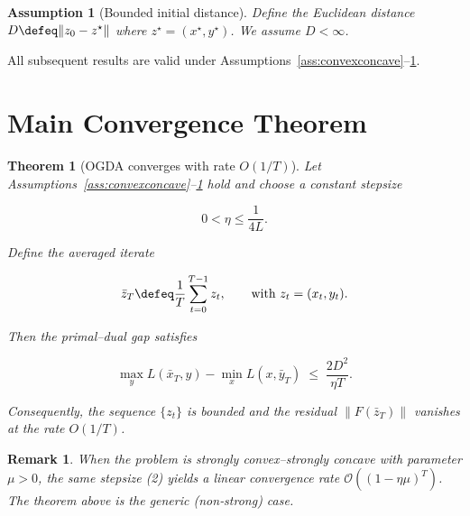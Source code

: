 \documentclass{article}
\newtheorem{theorem}{Theorem}
\newtheorem{assumption}{Assumption}
\newtheorem{remark}{Remark}
\begin{document}
\begin{assumption}[Bounded initial distance]\label{ass:bounded}
Define the Euclidean distance 
\(D\defeq\|z_{0}-z^{\star}\|\) where \(z^{\star}=(x^{\star},y^{\star})\). We assume \(D<\infty\).
\end{assumption}

All subsequent results are valid under Assumptions~\ref{ass:convexconcave}–\ref{ass:bounded}.

\section{Main Convergence Theorem}
\begin{theorem}[OGDA converges with rate \(O(1/T)\)]\label{thm:ogda}
Let Assumptions~\ref{ass:convexconcave}–\ref{ass:bounded} hold and choose a constant stepsize  

\[
0<\eta\le\frac{1}{4L}. \tag{2}
\]

Define the averaged iterate  

\[
\bar z_T\defeq\frac{1}{T}\sum_{t=0}^{T-1}z_t,\qquad 
\text{with }z_t=(x_t,y_t).
\]

Then the primal–dual gap satisfies  

\[
\max_{y}L(\bar x_T,y)-\min_{x}L(x,\bar y_T)
\;\le\;
\frac{2D^{2}}{\eta T}. \tag{3}
\]

Consequently, the sequence \(\{z_t\}\) is bounded and the residual  
\(\|F(\bar z_T)\|\) vanishes at the rate \(O(1/T)\).
\end{theorem}

\begin{remark}
When the problem is strongly convex–strongly concave with parameter \(\mu>0\), the same stepsize (2) yields a linear convergence rate \(\mathcal{O}((1-\eta\mu)^T)\). The theorem above is the generic (non‑strong) case.
\end{remark}

\end{document}
